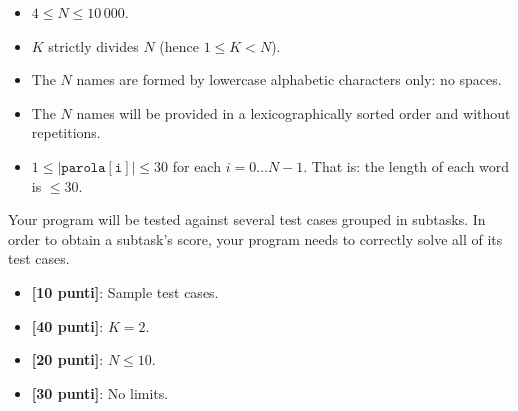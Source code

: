 \Constraints
\begin{itemize}[nolistsep, itemsep=2mm]
  \item $4 \le N \le 10\,000$.
  \item $K$ strictly divides $N$ (hence $1 \le K < N$).
  \item The $N$ names are formed by lowercase alphabetic characters only: no spaces.
  \item The $N$ names will be provided in a lexicographically sorted order and without repetitions.
  \item $1 \le |\mathtt{parola[i]}| \le 30$ for each $i=0\ldots N-1$. That is: the length of each word is $\le 30$.
\end{itemize}

\Scoring
Your program will be tested against several test cases grouped in subtasks.
In order to obtain a subtask's score, your program needs to correctly solve all of its test cases.

\begin{itemize}[nolistsep,itemsep=2mm]
  \item \textbf{ [10 punti]}: Sample test cases.
  \item \textbf{ [40 punti]}: $K = 2$.
  \item \textbf{ [20 punti]}: $N \le 10$.
  \item \textbf{ [30 punti]}: No limits.
\end{itemize}



\Examples
\begin{example}
%
%
%
\end{example}

